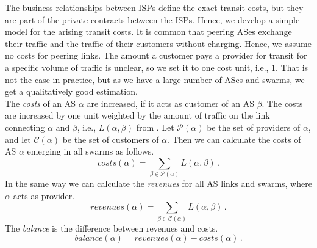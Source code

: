 The business relationships between ISPs define the exact transit costs, but they are part of the private contracts between the ISPs. Hence, we develop a simple model for the arising transit costs. It is common that peering ASes exchange their traffic and the traffic of their customers without charging. Hence, we assume no costs for peering links. The amount a customer pays a provider for transit for a specific volume of traffic is unclear, so we set it to one cost unit, i.e., $1$. That is not the case in practice, but as we have a large number of ASes and swarms, we get a qualitatively good estimation.\\
The \textit{costs} of an AS $\alpha$ are increased, if it acts as customer of an AS $\beta$. The costs are increased by one unit weighted by the amount of traffic on the link connecting $\alpha$ and $\beta$, i.e., $L(\alpha, \beta)$ from . Let $\mathcal P(\alpha)$ be the set of providers of $\alpha$, and let $\mathcal C(\alpha)$ be the set of customers of $\alpha$. Then we can calculate the costs of AS $\alpha$ emerging in all swarms as follows.
\begin{equation}\label{equ:costs}
costs(\alpha) = \sum_{\beta\in\mathcal P(\alpha)} L(\alpha,\beta) \, .
\end{equation}
In the same way we can calculate the \textit{revenues} for all AS links and swarms, where $\alpha$ acts as provider.
\begin{equation}\label{equ:revenues}
revenues(\alpha) = \sum_{\beta\in \mathcal C(\alpha)} L(\alpha,\beta) \, .
\end{equation}
The \textit{balance} is the difference between revenues and costs.
\begin{equation}\label{equ:balance}
balance(\alpha) = revenues(\alpha)-costs(\alpha) \, .
\end{equation}

